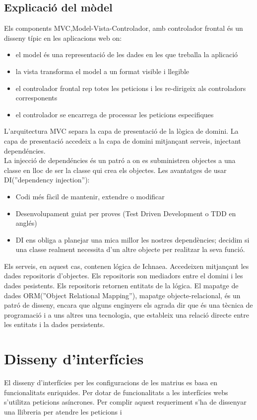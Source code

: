 \subsection{Explicaci\'{o} del m\`{o}del}
Els components MVC,Model-Vista-Controlador, amb controlador frontal \'{e}s un disseny t\'{i}pic en les aplicacions web on:
\begin{itemize}
\item el model \'{e}s una representaci\'{o} de les dades en les que treballa la aplicaci\'{o}
\item la vista transforma el model a un format visible i llegible
\item el controlador frontal rep totes les peticions i les re-dirigeix als controladors corresponents
\item el controlador se encarrega de processar les peticions especifiques
\end{itemize}
L'arquitectura MVC separa la capa de presentaci\'{o} de la l\`{o}gica de domini. La capa de presentaci\'{o} accedeix a la capa de domini mitjançant serveis, injectant depend\'{e}ncies. \\
La injecci\'{o} de depend\'{e}ncies \'{e}s un patr\'{o} a on es subministren objectes a una classe en lloc de ser la classe qui crea els objectes\cite{dependency_injection}. Les avantatges de usar DI(''dependency injection''):
\begin{itemize}
\item Codi m\'{e}s f\`{a}cil de mantenir, extendre o modificar
\item Desenvolupament guiat per proves (Test Driven Development o TDD en angl\'{e}s)
\item DI ens obliga a planejar una mica millor les nostres depend\`{e}ncies; decidim si una classe realment necessita d'un altre objecte per realitzar la seva funció.
\end{itemize}
Els serveis, en aquest cas, contenen l\'{o}gica de Ichnaea. Accedeixen mitjançant les dades repositoris d'objectes. Els repositoris son mediadors entre el domini i les dades pesistents. Els repositoris retornen entitats de la l\'{ogica}. El mapatge de dades ORM(''Object Relational Mapping''), mapatge objecte-relacional, \'{e}s un patr\'{o} de disseny, encara que alguns enginyers els agrada dir que \'{e}s una tècnica de programaci\'{o} i a uns altres una tecnologia, que estableix una relaci\'{o} directe entre les entitats i la dades persistents.\cite{orm}

\section{Disseny d'interf\'{i}cies}
El disseny d'interfícies per les configuracions de les matrius es basa en funcionalitats enriquides\cite{ria}. Per dotar de funcionalitats a les interfícies webs s'utilitza peticions asíncrones. Per complir aquest requeriment s'ha de dissenyar una llibreria per atendre les peticions i 
